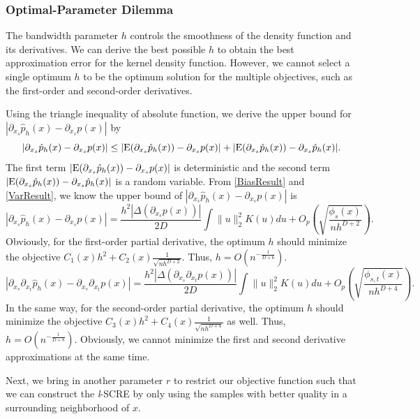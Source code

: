 \documentclass[aos,preprint]{imsart}
\theoremstyle{remark}
\begin{document}
\subsubsection{Optimal-Parameter Dilemma}
The bandwidth parameter $h$ controls the smoothness of the density function and its derivatives. We can derive the best possible $h$ to obtain the best approximation error for the kernel density function. However, we cannot select a single optimum $h$ to be the optimum solution for the multiple objectives, such as the first-order and second-order derivatives.

Using the triangle inequality of absolute function, we derive the upper bound for  $|\partial_{x_s} \hat{p}_h(x) - \partial_{x_s} p(x)|$ by
\[
|\partial_{x_s} \hat{p}_h(x) - \partial_{x_s} p(x)|\leq |{\rm E}(\partial_{x_s}  \hat{p}_h(x)) - \partial_{x_s}p(x)|+ |{\rm E}  (\partial_{x_s} \hat{p}_h(x)) -\partial_{x_s}\hat{p}_h(x)| .
\]
The first term $|{\rm E}(\partial_{x_s}  \hat{p}_h(x)) - \partial_{x_s}p(x)|$ is deterministic and the second term $|{\rm E}  (\partial_{x_s} \hat{p}_h(x)) -\partial_{x_s}\hat{p}_h(x)|$ is a random variable. From \eqref{BiasResult} and \eqref{VarResult}, we know the upper bound of $|\partial_{x_s} \hat{p}_h(x) - \partial_{x_s} p(x)| $ is
\[
|\partial_{x_s} \hat{p}_h(x) - \partial_{x_s} p(x)| =  \frac{h^2|\Delta (\partial_{x_s}p(x))|}{2D}  \int \|u\|_2^2 K(u) du +O_p( \sqrt{\frac{\phi_s(x)}{n h^{D+2}} } ).
\]
Obviously, for the first-order partial derivative, the optimum $h$ should minimize the objective $C_1(x)h^2+C_2(x)\frac{1}{\sqrt{n h^{D+2}}}$. Thus, $h = O({n^{-\frac{1}{D+6}}})$.
\[
|\partial_{x_s}\partial_{x_t} \hat{p}_h(x) - \partial_{x_s}\partial_{x_t} p(x)| = \frac{h^2 |\Delta (\partial_{x_s}\partial_{x_t} p(x))|}{2D} \int \|u\|_2^2 K(u) du + O_p(\sqrt{\frac{\phi_{s,t}(x)}{nh^{D+4}}}).
\]
In the same way, for the second-order partial derivative, the optimum $h$ should minimize the objective $C_3(x)h^2+C_4(x)\frac{1}{\sqrt{n h^{D+4}}}$ as well. Thus, $h = O(n^{-\frac{1}{D+8}})$. Obviously, we cannot minimize the first and second derivative approximations at the same time.

Next, we bring in another parameter $r$ to restrict our objective function such that we can construct the {\it l}-SCRE by only using the samples with better quality in a surrounding neighborhood of $x$.
\end{document}
